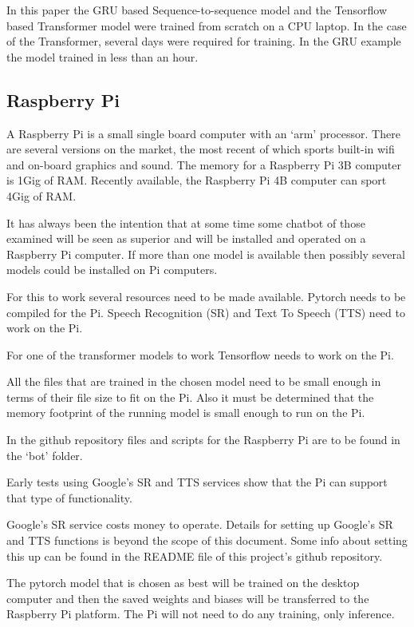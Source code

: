 In this paper the GRU based Sequence-to-sequence model and the Tensorflow based Transformer model were trained from scratch on a CPU laptop. In the case of the Transformer, several days were required for training. In the GRU example the model trained in less than an hour.

\subsection{Raspberry Pi}

A Raspberry Pi is a small single board computer with an `arm' processor. There are several versions on the market, the most recent of which sports built-in wifi and on-board graphics and sound. The memory for a Raspberry Pi 3B computer is 1Gig of RAM. Recently available, the Raspberry Pi 4B computer can sport 4Gig of RAM.

It has always been the intention that at some time some chatbot of those examined will be seen as superior and will be installed and operated on a Raspberry Pi computer. If more than one model is available then possibly several models could be installed on Pi computers.

For this to work several resources need to be made available. Pytorch needs to be compiled for the Pi. Speech Recognition (\ac{SR}) and Text To Speech (TTS) need to work on the Pi.

For one of the transformer models to work Tensorflow needs to work on the Pi.

All the files that are trained in the chosen model need to be small enough in terms of their file size to fit on the Pi. Also it must be determined that the memory footprint of the running model is small enough to run on the Pi.

In the github repository files and scripts for the Raspberry Pi are to be found in the \textquoteleft bot\textquoteright{} folder.

Early tests using Google\textquoteright s SR and TTS services show that the Pi can support that type of functionality. 

Google's SR service costs money to operate. Details for setting up Google's SR and TTS functions is beyond the scope of this document. Some info about setting this up can be
found in the README file of this project\textquoteright s github repository.

The pytorch model that is chosen as best will be trained on the desktop computer and then the saved weights and biases will be transferred to the Raspberry Pi platform. The Pi will not need to do any training, only inference. 

